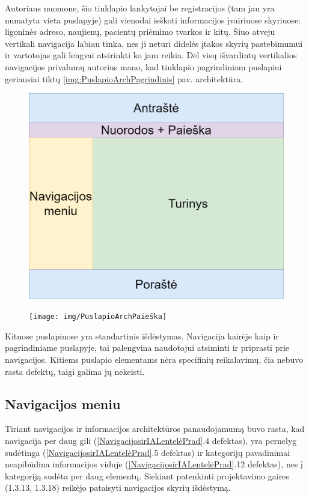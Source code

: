 \documentclass{VUMIFPSkursinis}
\begin{document}
Autoriaus nuomone, šio tinklapio lankytojai be registracijos (tam jau yra numatyta vieta puslapyje) gali vienodai ieškoti informacijos įvairiuose skyriuose: ligoninės adreso, naujienų, pacientų priėmimo tvarkos ir kitų. Šiuo atveju vertikali navigacija labiau tinka, nes ji neturi didelės įtakos skyrių pastebimumui ir vartotojas gali lengvai atsirinkti ko jam reikia. Dėl visų išvardintų vertikalios navigacijos privalumų autorius mano, kad tinklapio pagrindiniam puslapiui geriausiai tiktų \ref{img:PuslapioArchPagrindinis} pav. architektūra.

\begin{figure}[htb]
\centering
\begin{minipage}{.5\textwidth}
  \centering
  \includegraphics[width=0.9\linewidth]{img/PuslapioArchTurinys}
  \label{img:TurinysArch}
\end{minipage}%
\begin{minipage}{.5\textwidth}
  \centering
  \texttt{[image: img/PuslapioArchPaieška]}
  \label{img:PaieškaArch}
\end{minipage}
\end{figure}

Kituose puslapiuose yra standartinis išdėstymas. Navigacija kairėje kaip ir pagrindiniame puslapyje, tai palengvina naudotojui atsiminti ir priprasti prie navigacijos. Kitiems puslapio elementams nėra specifinių reikalavimų, čia nebuvo rasta defektų, taigi galima jų nekeisti.

\subsection{Navigacijos meniu}
Tiriant navigacijos ir informacijos architektūros panaudojamumą buvo rasta, kad navigacija per daug gili (\ref{NavigacijosirIALentelėPrad}.4 defektas), yra pernelyg sudėtinga (\ref{NavigacijosirIALentelėPrad}.5 defektas) ir kategorijų pavadinimai neapibūdina informacijos viduje (\ref{NavigacijosirIALentelėPrad}.12 defektas), nes į kategoriją sudėta per daug elementų. Siekiant patenkinti projektavimo gaires (1.3.13, 1.3.18) reikėjo pataisyti navigacijos skyrių išdėstymą.
\end{document}
